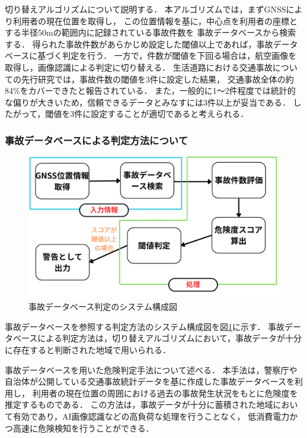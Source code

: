 \documentclass[uplatex,dvipdfmx]{jsarticle}
\begin{document}
切り替えアルゴリズムについて説明する．
本アルゴリズムでは，まずGNSSにより利用者の現在位置を取得し，
この位置情報を基に，中心点を利用者の座標とする半径$50$mの範囲内に記録されている事故件数を
事故データベースから検索する．
得られた事故件数があらかじめ設定した閾値以上であれば，事故データベースに基づく判定を行う．
一方で，件数が閾値を下回る場合は，航空画像を取得し，画像認識による判定に切り替える．
生活道路における交通事故についての先行研究では，事故件数の閾値を3件に設定した結果，
交通事故全体の約84\%をカバーできたと報告されている\cite{ref:accident_spot}．
また，一般的に1〜2件程度では統計的な偏りが大きいため，信頼できるデータとみなすには3件以上が妥当である．
したがって，閾値を3件に設定することが適切であると考えられる．

\subsubsection{事故データベースによる判定方法について}
\begin{figure}[H]
  \centering
  \includegraphics[width=14cm]{./Figs/system_data.png}
  \caption{事故データベース判定のシステム構成図}
  \label{fig:system_data}
\end{figure}

事故データベースを参照する判定方法のシステム構成図を図\ref{fig:system_data}に示す．
事故データベースによる判定方法は，切り替えアルゴリズムにおいて，事故データが十分に存在すると判断された地域で用いられる．

事故データベースを用いた危険判定手法について述べる．
本手法は，警察庁や自治体が公開している交通事故統計データを基に作成した事故データベースを利用し，
利用者の現在位置の周囲における過去の事故発生状況をもとに危険度を推定するものである．
この方法は，事故データが十分に蓄積された地域において有効であり，AI画像認識などの高負荷な処理を行うことなく，
低消費電力かつ高速に危険検知を行うことができる．
\end{document}
